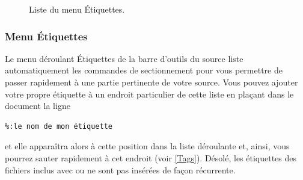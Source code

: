 \documentclass[11pt,french]{article}
\newcommand{\mnu}[1]{\textsf{#1}}
\begin{document}
\begin{figure}
\centering
{}
\caption{Liste du menu Étiquettes.\label{Tags}}
\end{figure}

\subsubsection{Menu Étiquettes}

Le menu déroulant \mnu{Étiquettes} de la barre d'outils du source liste automatiquement les commandes de sectionnement pour vous permettre de passer rapidement à une partie pertinente de votre source. Vous pouvez ajouter votre propre étiquette à un endroit particulier de cette liste en plaçant dans le document la ligne
\begin{verbatim}
%:le nom de mon étiquette
\end{verbatim}
et elle apparaîtra alors à cette position dans la liste déroulante et, ainsi, vous pourrez sauter rapidement à cet endroit (voir \vref{Tags}). Désolé, les étiquettes des fichiers inclus avec \verb|| ou \verb|| ne sont pas insérées de façon récurrente.

\end{document}
